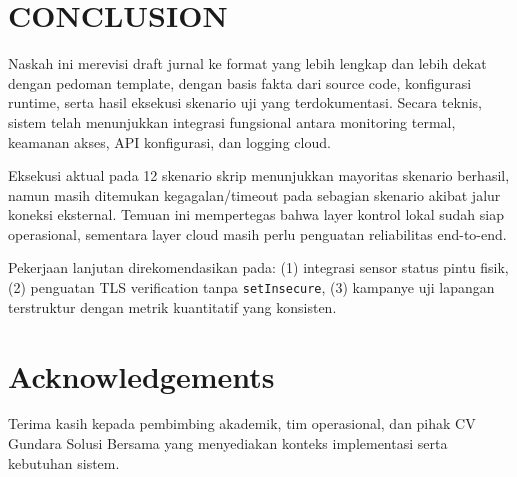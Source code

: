\documentclass[10pt,a4paper,twocolumn]{article}
\begin{document}
\section{CONCLUSION}
Naskah ini merevisi draft jurnal ke format yang lebih lengkap dan lebih dekat dengan pedoman template, dengan basis fakta dari source code, konfigurasi runtime, serta hasil eksekusi skenario uji yang terdokumentasi. Secara teknis, sistem telah menunjukkan integrasi fungsional antara monitoring termal, keamanan akses, API konfigurasi, dan logging cloud.

Eksekusi aktual pada 12 skenario skrip menunjukkan mayoritas skenario berhasil, namun masih ditemukan kegagalan/timeout pada sebagian skenario akibat jalur koneksi eksternal. Temuan ini mempertegas bahwa layer kontrol lokal sudah siap operasional, sementara layer cloud masih perlu penguatan reliabilitas end-to-end.

Pekerjaan lanjutan direkomendasikan pada: (1) integrasi sensor status pintu fisik, (2) penguatan TLS verification tanpa \texttt{setInsecure}, (3) kampanye uji lapangan terstruktur dengan metrik kuantitatif yang konsisten.

\section*{Acknowledgements}
Terima kasih kepada pembimbing akademik, tim operasional, dan pihak CV Gundara Solusi Bersama yang menyediakan konteks implementasi serta kebutuhan sistem.



\end{document}
